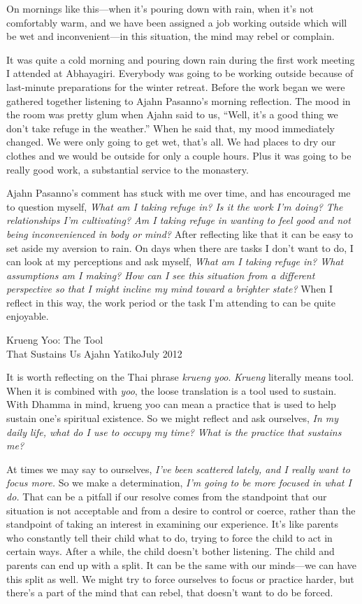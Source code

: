 On mornings like this---when it's pouring down with rain, when it's not 
comfortably warm, and we have been assigned a job working outside which 
will be wet and inconvenient---in this situation, the mind may rebel or 
complain.

It was quite a cold morning and pouring down rain during the first work 
meeting I attended at Abhayagiri. Everybody was going to be working 
outside because of last-minute preparations for the winter retreat. 
Before the work began we were gathered together listening to Ajahn 
Pasanno's morning reflection. The mood in the room was pretty glum when 
Ajahn said to us, ``Well, it's a good thing we don't take refuge in the 
weather.'' When he said that, my mood immediately changed. We were only 
going to get wet, that's all. We had places to dry our clothes and we 
would be outside for only a couple hours. Plus it was going to be 
really good work, a substantial service to the monastery.

Ajahn Pasanno's comment has stuck with me over time, and has encouraged 
me to question myself, \emph{What am I taking refuge in? Is it the work 
I'm doing? The relationships I'm cultivating? Am I taking refuge in 
wanting to feel good and not being inconvenienced in body or mind?} 
After reflecting like that it can be easy to set aside my aversion to 
rain. On days when there are tasks I don't want to do, I can look at my 
perceptions and ask myself, \emph{What am I taking refuge in? What 
assumptions am I making? How can I see this situation from a different 
perspective so that I might incline my mind toward a brighter state?} 
When I reflect in this way, the work period or the task I'm attending 
to can be quite enjoyable.

{Krueng Yoo: The Tool\\That Sustains Us}
{Ajahn Yatiko}{July 2012}

It is worth reflecting on the Thai phrase \emph{krueng yoo}. 
\emph{Krueng} literally means tool. When it is combined with 
\emph{yoo}, the loose translation is a tool used to sustain. With 
Dhamma in mind, krueng yoo can mean a practice that is used to help 
sustain one's spiritual existence. So we might reflect and ask 
ourselves, \emph{In my daily life, what do I use to occupy my time? 
What is the practice that sustains me?}

At times we may say to ourselves, \emph{I've been scattered lately, and 
I really want to focus more.} So we make a determination, \emph{I'm 
going to be more focused in what I do.} That can be a pitfall if our 
resolve comes from the standpoint that our situation is not acceptable 
and from a desire to control or coerce, rather than the standpoint of 
taking an interest in examining our experience. It's like parents who 
constantly tell their child what to do, trying to force the child to 
act in certain ways. After a while, the child doesn't bother listening. 
The child and parents can end up with a split. It can be the same with 
our minds---we can have this split as well. We might try to force 
ourselves to focus or practice harder, but there's a part of the mind 
that can rebel, that doesn't want to do be forced.

